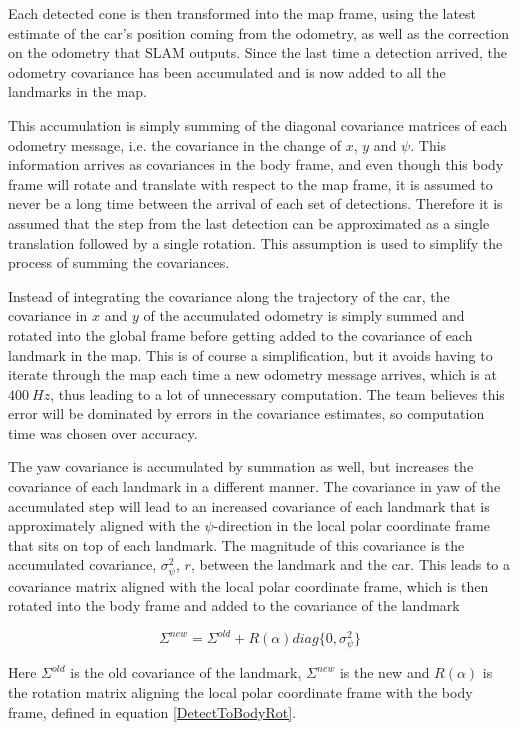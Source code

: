 Each detected cone is then transformed into the map frame, using the latest estimate of the car's position coming from the odometry, as well as the correction on the odometry that \gls{SLAM} outputs. Since the last time a detection arrived, the odometry covariance has been accumulated and is now added to all the landmarks in the map. 

This accumulation is simply summing of the diagonal covariance matrices of each odometry message, i.e. the covariance in the change of $x$, $y$ and $\psi$. This information arrives as covariances in the body frame, and even though this body frame will rotate and translate with respect to the map frame, it is assumed to never be a long time between the arrival of each set of detections. Therefore it is assumed that the step from the last detection can be approximated as a single translation followed by a single rotation. This assumption is used to simplify the process of summing the covariances. 

Instead of integrating the covariance along the trajectory of the car, the covariance in $x$ and $y$ of the accumulated odometry is simply summed and rotated into the global frame before getting added to the covariance of each landmark in the map. This is of course a simplification, but it avoids having to iterate through the map each time a new odometry message arrives, which is at $\SI{400}{Hz}$, thus leading to a lot of unnecessary computation. The team believes this error will be dominated by errors in the covariance estimates, so computation time was chosen over accuracy. 

The yaw covariance is accumulated by summation as well, but increases the covariance of each landmark in a different manner. The covariance in yaw of the accumulated step will lead to an increased covariance of each landmark that is approximately aligned with the $\psi$-direction in the local polar coordinate frame that sits on top of each landmark. The magnitude of this covariance is the accumulated covariance, $\sigma_{\psi}^2$, $r$, between the landmark and the car. This leads to a covariance matrix aligned with the local polar coordinate frame, which is then rotated into the body frame and added to the covariance of the landmark

\begin{equation}
    \Sigma^{new} = \Sigma^{old} + R(\alpha)diag\{0,\sigma^2_{\psi}\}
\end{equation}

Here $\Sigma^{old}$ is the old covariance of the landmark, $\Sigma^{new}$ is the new and $R(\alpha)$ is the rotation matrix aligning the local polar coordinate frame with the body frame, defined in equation \ref{DetectToBodyRot}. 

